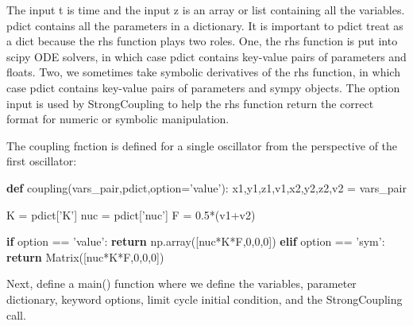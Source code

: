 \documentclass[
  english,
  a4paper,
  oneside]{article}
\newenvironment{Shaded}{}{}
\newcommand{\ControlFlowTok}[1]{\textcolor[rgb]{0.00,0.44,0.13}{\textbf{#1}}}
\newcommand{\DecValTok}[1]{\textcolor[rgb]{0.25,0.63,0.44}{#1}}
\newcommand{\FloatTok}[1]{\textcolor[rgb]{0.25,0.63,0.44}{#1}}
\newcommand{\KeywordTok}[1]{\textcolor[rgb]{0.00,0.44,0.13}{\textbf{#1}}}
\newcommand{\NormalTok}[1]{#1}
\newcommand{\OperatorTok}[1]{\textcolor[rgb]{0.40,0.40,0.40}{#1}}
\newcommand{\StringTok}[1]{\textcolor[rgb]{0.25,0.44,0.63}{#1}}
\begin{document}
The input t is time and the input z is an array or list containing all
the variables. pdict contains all the parameters in a dictionary. It is
important to pdict treat as a dict because the rhs function plays two
roles. One, the rhs function is put into scipy ODE solvers, in which
case pdict contains key-value pairs of parameters and floats. Two, we
sometimes take symbolic derivatives of the rhs function, in which case
pdict contains key-value pairs of parameters and sympy objects. The
option input is used by StrongCoupling to help the rhs function return
the correct format for numeric or symbolic manipulation.

The coupling fnction is defined for a single oscillator from the
perspective of the first oscillator:

\begin{Shaded}
\begin{Highlighting}[]
\KeywordTok{def}\NormalTok{ coupling(vars_pair,pdict,option}\OperatorTok{=}\StringTok{'value'}\NormalTok{):}
\NormalTok{    x1,y1,z1,v1,x2,y2,z2,v2 }\OperatorTok{=}\NormalTok{ vars_pair}
    
\NormalTok{    K }\OperatorTok{=}\NormalTok{ pdict[}\StringTok{'K'}\NormalTok{]}
\NormalTok{    nuc }\OperatorTok{=}\NormalTok{ pdict[}\StringTok{'nuc'}\NormalTok{]}
\NormalTok{    F }\OperatorTok{=} \FloatTok{0.5}\OperatorTok{*}\NormalTok{(v1}\OperatorTok{+}\NormalTok{v2)}
    
    \ControlFlowTok{if}\NormalTok{ option }\OperatorTok{==} \StringTok{'value'}\NormalTok{:}
        \ControlFlowTok{return}\NormalTok{ np.array([nuc}\OperatorTok{*}\NormalTok{K}\OperatorTok{*}\NormalTok{F,}\DecValTok{0}\NormalTok{,}\DecValTok{0}\NormalTok{,}\DecValTok{0}\NormalTok{])}
    \ControlFlowTok{elif}\NormalTok{ option }\OperatorTok{==} \StringTok{'sym'}\NormalTok{:}
        \ControlFlowTok{return}\NormalTok{ Matrix([nuc}\OperatorTok{*}\NormalTok{K}\OperatorTok{*}\NormalTok{F,}\DecValTok{0}\NormalTok{,}\DecValTok{0}\NormalTok{,}\DecValTok{0}\NormalTok{])}
\end{Highlighting}
\end{Shaded}

Next, define a main() function where we define the variables, parameter
dictionary, keyword options, limit cycle initial condition, and the
StrongCoupling call.
\end{document}

